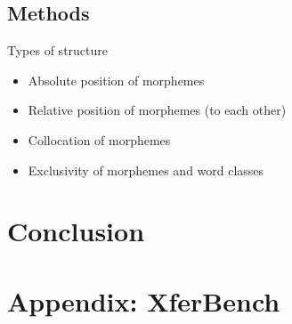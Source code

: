 \section{Methods}

Types of structure
\begin{itemize}
  \item Absolute position of morphemes
  \item Relative position of morphemes (to each other)
  \item Collocation of morphemes
  \item Exclusivity of morphemes and word classes
\end{itemize}



\chapter{Conclusion}



% 

\appendix

\chapter{Appendix: XferBench}



